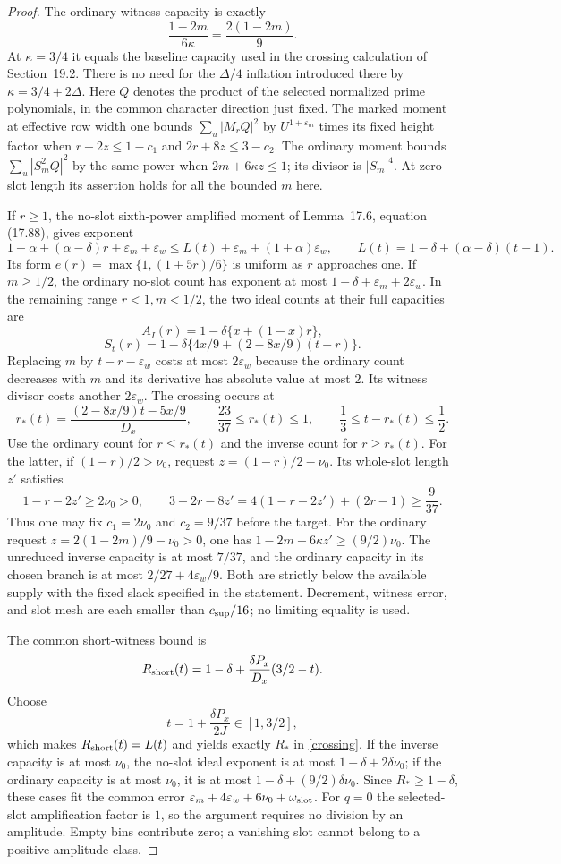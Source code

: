 \documentclass[10pt,reqno,a4paper]{amsart}
\theoremstyle{remark}
\newcommand{\eps}{\varepsilon}
\begin{document}
\begin{proof}
The ordinary-witness capacity is exactly
\[
           \frac{1-2m}{6\kappa}=\frac{2(1-2m)}9.
\]
At $\kappa=3/4$ it equals the baseline capacity used in the crossing
calculation of Section~19.2. There is no need for the $\Delta/4$
inflation introduced there by $\kappa=3/4+2\Delta$.
Here $Q$ denotes the product of the selected normalized prime
polynomials, in the common character direction just fixed.
The marked moment at effective row width one bounds
$\sum_u|M_r Q|^2$ by $U^{1+\eps_m}$ times its fixed height factor
when $r+2z\le1-c_1$ and $2r+8z\le3-c_2$.
The ordinary moment bounds $\sum_u|S_m^2Q|^2$ by the same power
when $2m+6\kappa z\le1$; its divisor is $|S_m|^4$.
At zero slot length its assertion holds for all the bounded $m$ here.

If $r\ge1$, the no-slot sixth-power amplified moment of Lemma~17.6,
equation (17.88), gives exponent
\[
 1-\alpha+(\alpha-\delta)r+\eps_m+\eps_w
 \le L(t)+\eps_m+(1+\alpha)\eps_w,
 \qquad L(t)=1-\delta+(\alpha-\delta)(t-1).
\]
Its form $e(r)=\max\{1,(1+5r)/6\}$ is uniform as $r$ approaches one.
If $m\ge1/2$, the ordinary no-slot count has exponent at most
$1-\delta+\eps_m+2\eps_w$. In the remaining range $r<1,m<1/2$,
the two ideal counts at their full capacities are
\[
 A_I(r)=1-\delta\{x+(1-x)r\},
\]
\[
 S_t(r)=1-\delta\{4x/9+(2-8x/9)(t-r)\}.
\]
Replacing $m$ by $t-r-\eps_w$ costs at most $2\eps_w$ because the
ordinary count decreases with $m$ and its derivative has absolute
value at most $2$. Its witness divisor costs another $2\eps_w$.
The crossing occurs at
\[
 r_*(t)=\frac{(2-8x/9)t-5x/9}{D_x},
 \qquad \frac{23}{37}\le r_*(t)\le1,
 \qquad \frac13\le t-r_*(t)\le\frac12.
\]
Use the ordinary count for $r\le r_*(t)$ and the inverse count for
$r\ge r_*(t)$. For the latter, if $(1-r)/2>\nu_0$, request
$z=(1-r)/2-\nu_0$. Its whole-slot length $z'$ satisfies
\[
 1-r-2z'\ge2\nu_0>0,\qquad
 3-2r-8z'=4(1-r-2z')+(2r-1)\ge\frac9{37}.
\]
Thus one may fix $c_1=2\nu_0$ and $c_2=9/37$ before the target.
For the ordinary request $z=2(1-2m)/9-\nu_0>0$, one has
$1-2m-6\kappa z'\ge(9/2)\nu_0$.
The unreduced inverse capacity is at most $7/37$, and the ordinary
capacity in its chosen branch is at most $2/27+4\eps_w/9$.
Both are strictly below the available supply with the fixed slack
specified in the statement. Decrement, witness error, and slot mesh
are each smaller than $c_{\rm sup}/16$; no limiting equality is used.

The common short-witness bound is
\[
 R_{\rm short}(t)=1-\delta+
                   \frac{\delta P_x}{D_x}(3/2-t).
\]
Choose
\[
             t=1+\frac{\delta P_x}{2J}\in[1,3/2],
\]
which makes $R_{\rm short}(t)=L(t)$ and yields exactly $R_*$ in
\eqref{crossing}. If the inverse capacity is at most $\nu_0$,
the no-slot ideal exponent is at most $1-\delta+2\delta\nu_0$;
if the ordinary capacity is at most $\nu_0$, it is at most
$1-\delta+(9/2)\delta\nu_0$. Since $R_*\ge1-\delta$, these
cases fit the common error
$\eps_m+4\eps_w+6\nu_0+\omega_{\rm slot}$.
For $q=0$ the selected-slot amplification factor is $1$, so the
argument requires no division by an amplitude. Empty bins contribute zero; a vanishing slot
cannot belong to a positive-amplitude class.


\end{proof}
\end{document}
